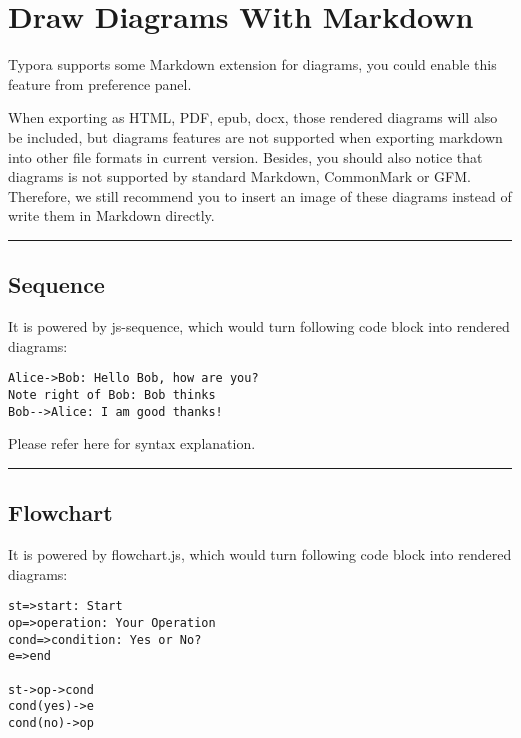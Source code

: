 \documentclass[]{article}
\date{}
\begin{document}
\hypertarget{header-n3}{%
\section{Draw Diagrams With Markdown}\label{header-n3}}

Typora supports some Markdown extension for diagrams, you could enable
this feature from preference panel.

When exporting as HTML, PDF, epub, docx, those rendered diagrams will
also be included, but diagrams features are not supported when exporting
markdown into other file formats in current version. Besides, you should
also notice that diagrams is not supported by standard Markdown,
CommonMark or GFM. Therefore, we still recommend you to insert an image
of these diagrams instead of write them in Markdown directly.

\begin{center}\rule{0.5\linewidth}{\linethickness}\end{center}

\hypertarget{header-n9}{%
\subsection{Sequence}\label{header-n9}}

It is powered by js-sequence, which would turn following code block into
rendered diagrams:

\begin{verbatim}
Alice->Bob: Hello Bob, how are you?
Note right of Bob: Bob thinks
Bob-->Alice: I am good thanks!
\end{verbatim}

Please refer here for syntax explanation.

\begin{center}\rule{0.5\linewidth}{\linethickness}\end{center}

\hypertarget{header-n17}{%
\subsection{Flowchart}\label{header-n17}}

It is powered by flowchart.js, which would turn following code block
into rendered diagrams:

\begin{verbatim}
st=>start: Start
op=>operation: Your Operation
cond=>condition: Yes or No?
e=>end

st->op->cond
cond(yes)->e
cond(no)->op
\end{verbatim}
\end{document}
